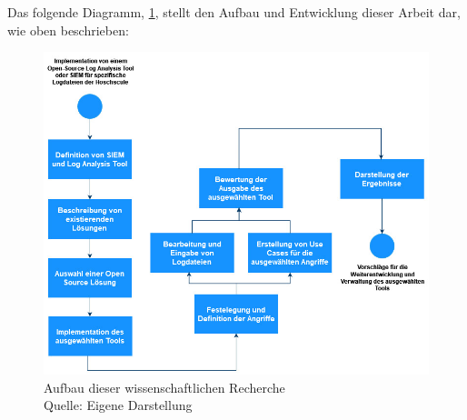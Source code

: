 \newpage
Das folgende Diagramm, \ref{fig:AblaufderArbeit}, stellt den Aufbau und Entwicklung dieser Arbeit dar, wie oben beschrieben:

\begin{figure}[H]
   \centering
   \includegraphics[width=1\textwidth]{assets/1_p1.jpg}
   \caption[Aufbau dieser wissenschaftlichen Recherche]
   {Aufbau dieser wissenschaftlichen Recherche \\Quelle: Eigene Darstellung }
   \label{fig:AblaufderArbeit}
   \centering
\end{figure}



